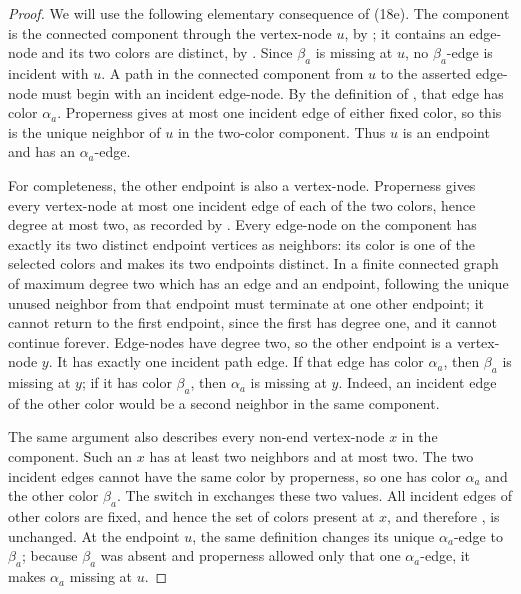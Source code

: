 \begin{proof}
We will use the following elementary consequence of (18e).  The component
is the connected component through the vertex-node \(u\), by
; it contains an edge-node and its two colors
are distinct, by .  Since \(\beta_a\) is
missing at \(u\), no \(\beta_a\)-edge is incident with \(u\).  A path in
the connected component from \(u\) to the asserted edge-node must begin
with an incident edge-node.  By the definition of
, that edge has color \(\alpha_a\).
Properness gives at most one incident edge of either fixed color, so this
is the unique neighbor of \(u\) in the two-color component.  Thus \(u\)
is an endpoint and has an \(\alpha_a\)-edge.

For completeness, the other endpoint is also a vertex-node.  Properness
gives every vertex-node at most one incident edge of each of the two
colors, hence degree at most two, as recorded by
.  Every edge-node on the
component has exactly its two distinct endpoint vertices as neighbors:
its color is one of the selected colors and
 makes its two endpoints distinct.
In a finite connected graph of maximum degree two which has an edge and
an endpoint, following the unique unused neighbor from that endpoint must
terminate at one other endpoint; it cannot return to the first endpoint,
since the first has degree one, and it cannot continue forever.  Edge-nodes
have degree two, so the other endpoint is a vertex-node \(y\).  It has
exactly one incident path edge.  If that edge has color \(\alpha_a\), then
\(\beta_a\) is missing at \(y\); if it has color \(\beta_a\), then
\(\alpha_a\) is missing at \(y\).  Indeed, an incident edge of the other
color would be a second neighbor in the same component.

The same argument also describes every non-end vertex-node \(x\) in the
component.  Such an \(x\) has at least two neighbors and at most two.
The two incident edges cannot have the same color by properness, so one
has color \(\alpha_a\) and the other color \(\beta_a\).  The switch in
 exchanges these two values.  All incident
edges of other colors are fixed, and hence the set of colors present at
\(x\), and therefore , is unchanged.  At the
endpoint \(u\), the same definition changes its unique
\(\alpha_a\)-edge to \(\beta_a\); because \(\beta_a\) was absent and
properness allowed only that one \(\alpha_a\)-edge, it makes
\(\alpha_a\) missing at \(u\).


\end{proof}
